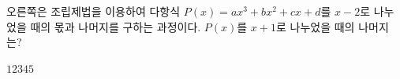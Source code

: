 \noindent\begin{minipage}[t]{0.58\linewidth}\vspace{0pt}\raggedright 오른쪽은 조립제법을 이용하여 다항식 $P(x)=ax^3+bx^2+cx+d$를 $x-2$로 나누었을 때의 몫과 나머지를 구하는 과정이다. $P(x)$를 $x+1$로 나누었을 때의 나머지는? \end{minipage}\hfill\begin{minipage}[t]{0.4\linewidth}\vspace{0pt}\centering \resizebox{\ifdim\width>\linewidth\linewidth\else\width\fi}{!}{}\end{minipage}\par
\begin{choices32}{$1$}{$2$}{$3$}{$4$}{$5$}\end{choices32}
